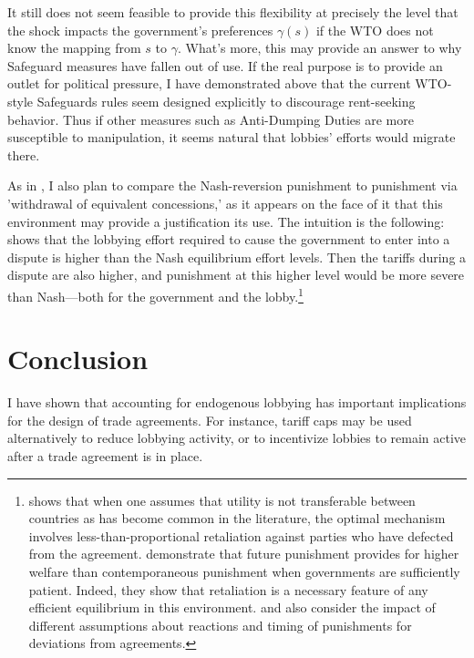 \documentclass[12pt]{article}
\newcommand{\ga}{\gamma}
\begin{document}
It still does not seem feasible to provide this flexibility at precisely the level that the shock impacts the government's preferences $\ga(s)$ if the WTO does not know the mapping from $s$ to $\ga$. What's more, this may provide an answer to why Safeguard measures have fallen out of use. If the real purpose is to provide an outlet for political pressure, I have demonstrated above that the current WTO-style Safeguards rules seem designed explicitly to discourage rent-seeking behavior. Thus if other measures such as Anti-Dumping Duties are more susceptible to manipulation, it seems natural that lobbies' efforts would migrate there.

As in \Textcite{zissimos}, I also plan to compare the Nash-reversion punishment to punishment via 'withdrawal of equivalent concessions,' as it appears on the face of it that this environment may provide a justification its use. The intuition is the following: \Textcite{buzard2013a} shows that the lobbying effort required to cause the government to enter into a dispute is higher than the Nash equilibrium effort levels. Then the tariffs during a dispute are also higher, and punishment at this higher level would be more severe than Nash---both for the government and the lobby.\footnote{\Textcite{beshkar2010a} shows that when one assumes that utility is not transferable between countries as has become common in the literature, the optimal mechanism involves less-than-proportional retaliation against parties who have defected from the agreement. \Textcite{martinvergote} demonstrate that future punishment provides for higher welfare than contemporaneous punishment when governments are sufficiently patient. Indeed, they show that retaliation is a necessary feature of any efficient equilibrium in this environment. \Textcite{hungerford} and \Textcite{riezman1991} also consider the impact of different assumptions about reactions and timing of punishments for deviations from agreements.}

		


%

\section{Conclusion}
\label{sec:concl}
I have shown that accounting for endogenous lobbying has important implications for the design of trade agreements. For instance, tariff caps may be used alternatively to reduce lobbying activity, or to incentivize lobbies to remain active after a trade agreement is in place.
\end{document}
